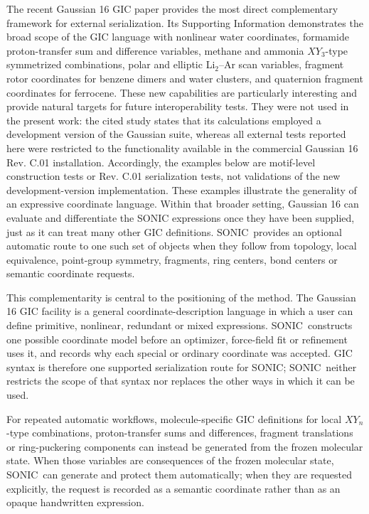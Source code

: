 \documentclass[journal=jctcce,manuscript=article,layout=traditional]{achemso}
\newcommand{\SONIC}{SONIC}
\theoremstyle{definition}
\begin{document}
The recent Gaussian 16 GIC paper provides the most direct complementary
framework for external serialization.  Its Supporting Information demonstrates
the broad scope of the GIC language with nonlinear water coordinates, formamide
proton-transfer sum and difference variables, methane and ammonia
\(XY_3\)-type symmetrized combinations, polar and elliptic Li\(_2\)--Ar scan
variables, fragment rotor coordinates for benzene dimers and water clusters,
and quaternion fragment coordinates for ferrocene.\cite{Marenich2025GIC}
These new capabilities are particularly interesting and provide natural targets
for future interoperability tests.  They were not used in the present work:
the cited study states that its calculations employed a development version of
the Gaussian suite, whereas all external tests reported here were restricted to
the functionality available in the commercial Gaussian 16 Rev. C.01
installation.  Accordingly, the examples below are motif-level construction
tests or Rev. C.01 serialization tests, not validations of the new
development-version implementation.
These examples illustrate the generality of an expressive coordinate language.
Within that broader setting, Gaussian 16 can evaluate and differentiate the
SONIC expressions once they have been supplied, just as it can treat many other
GIC definitions.  \SONIC\ provides an optional automatic route to one such set of
objects when they follow from topology, local equivalence, point-group symmetry,
fragments, ring centers, bond centers or semantic coordinate requests.

This complementarity is central to the positioning of the method.  The Gaussian
16 GIC facility is a general coordinate-description language in which a user can
define primitive, nonlinear, redundant or mixed expressions.  \SONIC\ constructs
one possible coordinate model before an optimizer, force-field fit or refinement
uses it, and records why each special or ordinary coordinate was accepted.  GIC
syntax is therefore one supported serialization route for \SONIC; \SONIC\ neither
restricts the scope of that syntax nor replaces the other ways in which it can
be used.

For repeated automatic workflows, molecule-specific GIC definitions for local
\(XY_n\)-type combinations, proton-transfer sums and differences, fragment
translations or ring-puckering components can instead be generated from the
frozen molecular state.  When those variables are consequences
of the frozen molecular state, \SONIC\ can generate and protect them
automatically; when they are requested explicitly, the request is recorded as a
semantic coordinate rather than as an opaque handwritten expression.
\end{document}
